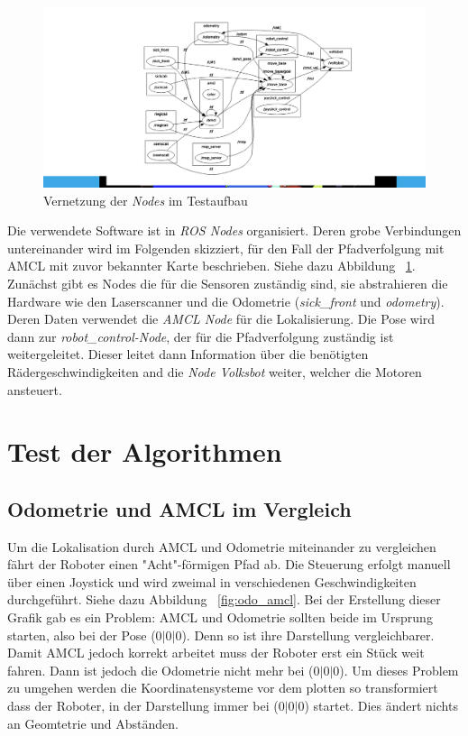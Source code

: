 \documentclass[11pt,a4paper]{article}
\begin{document}
{{	\begin{figure}[h]
		\includegraphics[trim=9cm 1cm 7cm 1cm , clip= true,width=\textwidth]{pictures/node_graph.png}
		\caption{Vernetzung der \textit{Nodes} im Testaufbau \label{fig:nodes}}
	\end{figure}
	Die verwendete Software ist in \textit{ROS Nodes} organisiert. Deren grobe Verbindungen untereinander wird im Folgenden skizziert, f\"ur den Fall der Pfadverfolgung mit AMCL mit zuvor bekannter Karte beschrieben. Siehe dazu Abbildung ~\ref{fig:nodes}. 
	\\
	Zun\"achst gibt es Nodes die f\"ur die Sensoren zust\"andig sind, sie abstrahieren die Hardware wie den Laserscanner und die Odometrie (\textit{sick\_front} und \textit{odometry}). Deren Daten verwendet die \textit{AMCL Node} f\"ur die Lokalisierung. Die Pose wird dann zur \textit{robot\_control-Node}, der f\"ur die Pfadverfolgung zust\"andig ist weitergeleitet. Dieser leitet dann Information über die ben\"otigten R\"adergeschwindigkeiten and die \textit{Node Volksbot} weiter, welcher die Motoren ansteuert.
	
} 

\section{Test der Algorithmen} 
\subsection{Odometrie und AMCL im Vergleich}




	Um die Lokalisation durch AMCL und Odometrie miteinander zu vergleichen f\"ahrt der Roboter einen "Acht"-f\"ormigen Pfad ab. Die Steuerung erfolgt manuell \"uber einen Joystick und wird zweimal in verschiedenen Geschwindigkeiten durchgef\"uhrt. Siehe dazu Abbildung ~\ref{fig:odo_amcl}. Bei der Erstellung dieser Grafik gab es ein Problem: AMCL und Odometrie sollten beide im Ursprung starten, also bei der Pose (0$|$0$|$0). Denn so ist ihre Darstellung vergleichbarer. Damit AMCL jedoch korrekt arbeitet muss der Roboter erst ein Stück weit fahren. Dann ist jedoch die Odometrie nicht mehr bei (0$|$0$|$0). Um dieses Problem zu umgehen werden die Koordinatensysteme vor dem plotten so transformiert dass der Roboter, in der Darstellung immer bei (0$|$0$|$0) startet. Dies \"andert nichts an Geomtetrie und Abst\"anden.    


}
\end{document}
